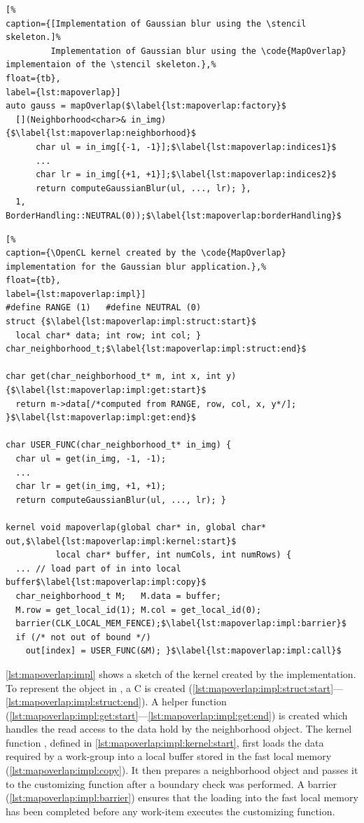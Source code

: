 \begin{lstlisting}[%
caption={[Implementation of Gaussian blur using the \stencil skeleton.]%
         Implementation of Gaussian blur using the \code{MapOverlap} implementaion of the \stencil skeleton.},%
float={tb},
label={lst:mapoverlap}]
auto gauss = mapOverlap($\label{lst:mapoverlap:factory}$
  [](Neighborhood<char>& in_img) {$\label{lst:mapoverlap:neighborhood}$
      char ul = in_img[{-1, -1}];$\label{lst:mapoverlap:indices1}$
      ...
      char lr = in_img[{+1, +1}];$\label{lst:mapoverlap:indices2}$
      return computeGaussianBlur(ul, ..., lr); },
  1, BorderHandling::NEUTRAL(0));$\label{lst:mapoverlap:borderHandling}$
\end{lstlisting}


\begin{lstlisting}[%
caption={\OpenCL kernel created by the \code{MapOverlap} implementation for the Gaussian blur application.},%
float={tb},
label={lst:mapoverlap:impl}]
#define RANGE (1)   #define NEUTRAL (0)
struct {$\label{lst:mapoverlap:impl:struct:start}$
  local char* data; int row; int col; } char_neighborhood_t;$\label{lst:mapoverlap:impl:struct:end}$

char get(char_neighborhood_t* m, int x, int y) {$\label{lst:mapoverlap:impl:get:start}$
  return m->data[/*computed from RANGE, row, col, x, y*/]; }$\label{lst:mapoverlap:impl:get:end}$

char USER_FUNC(char_neighborhood_t* in_img) {
  char ul = get(in_img, -1, -1);
  ...
  char lr = get(in_img, +1, +1);
  return computeGaussianBlur(ul, ..., lr); }

kernel void mapoverlap(global char* in, global char* out,$\label{lst:mapoverlap:impl:kernel:start}$
          local char* buffer, int numCols, int numRows) {
  ... // load part of in into local buffer$\label{lst:mapoverlap:impl:copy}$
  char_neighborhood_t M;   M.data = buffer;
  M.row = get_local_id(1); M.col = get_local_id(0);
  barrier(CLK_LOCAL_MEM_FENCE);$\label{lst:mapoverlap:impl:barrier}$
  if (/* not out of bound */)
    out[index] = USER_FUNC(&M); }$\label{lst:mapoverlap:impl:call}$
\end{lstlisting}

\autoref{lst:mapoverlap:impl} shows a sketch of the \OpenCL kernel created by the  implementation.
To represent the  object in \OpenCL, a C  is created (\autoref{lst:mapoverlap:impl:struct:start}---\autoref{lst:mapoverlap:impl:struct:end}).
A helper function  (\autoref{lst:mapoverlap:impl:get:start}---\autoref{lst:mapoverlap:impl:get:end}) is created which handles the read access to the data hold by the neighborhood object.
The kernel function , defined in \autoref{lst:mapoverlap:impl:kernel:start}, first loads the data required by a work-group into a local buffer stored in the fast local \GPU memory (\autoref{lst:mapoverlap:impl:copy}).
It then prepares a neighborhood object and passes it to the customizing function after a boundary check was performed.
A barrier (\autoref{lst:mapoverlap:impl:barrier}) ensures that the loading into the fast local memory has been completed before any work-item executes the customizing function.

